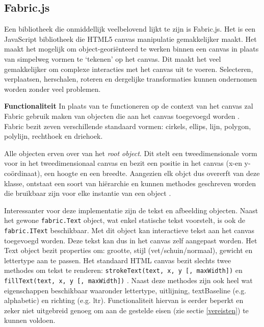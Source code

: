 \subsection{Fabric.js}
Een bibliotheek die onmiddellijk veelbelovend lijkt te zijn is Fabric.js. Het is een JavaScript bibliotheek die HTML5 canvas manipulatie gemakkelijker maakt. Het maakt het mogelijk om object-geori\"{e}nteerd te werken binnen een canvas in plaats van simpelweg vormen te `tekenen' op het canvas. Dit maakt het veel gemakkelijker om complexe interacties met het canvas uit te voeren. Selecteren, verplaatsen, herschalen, roteren en dergelijke transformaties kunnen ondernomen worden zonder veel problemen. 

\textbf{Functionaliteit} \break 
In plaats van te functioneren op de context van het canvas zal Fabric gebruik maken van objecten die aan het canvas toegevoegd worden \cite{FabricJSDocs}. Fabric bezit zeven verschillende standaard vormen: cirkels, ellips, lijn, polygon, polylijn, rechthoek en driehoek.

Alle objecten erven over van het \textit{root object}. Dit stelt een tweedimensionale vorm voor in het tweedimensionaal canvas en bezit een positie in het canvas (x-en y-co\"{o}rdinaat), een hoogte en een breedte. Aangezien elk objct dus overerft van deze klasse, ontstaat een soort van hi\"{e}rarchie en kunnen methodes geschreven worden die bruikbaar zijn voor elke instantie van een object \cite{FabricJSIntro}. 

Interessanter voor deze implementatie zijn de tekst en afbeelding objecten. Naast het gewone \texttt{fabric.Text} object, wat enkel statische tekst voorstelt, is ook de \texttt{fabric.IText} beschikbaar. Met dit object kan interactieve tekst aan het canvas toegevoegd worden. Deze tekst kan dus in het canvas zelf aangepast worden. Het Text object bezit properties om: grootte, stijl (vet/schuin/normaal), gewicht en lettertype aan te passen. Het standaard HTML canvas bezit slechts twee methodes om tekst te renderen: \texttt{strokeText(text, x, y [, maxWidth])} en \texttt{fillText(text, x, y [, maxWidth])} \cite{MozillaCanvas-DrawingText}. 
Naast deze methodes zijn ook heel wat eigenschappen beschikbaar waaronder lettertype, uitlijning, textBaseline (e.g. alphabetic) en richting (e.g. ltr). Functionaliteit hiervan is eerder beperkt en zeker niet uitgebreid genoeg om aan de gestelde eisen (zie sectie \ref{vereisten}) te kunnen voldoen. 


